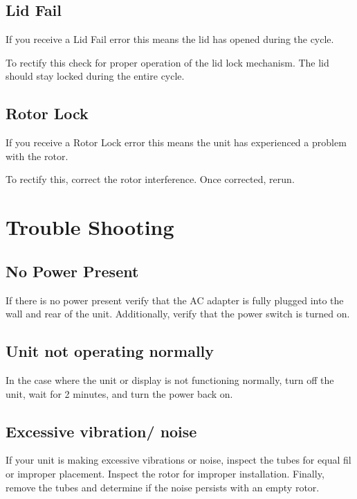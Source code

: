 \documentclass[12pt]{../SOP3_beta}
\begin{document}
\subsection*{Lid Fail}

\NP If you receive a Lid Fail error this means the lid has opened during the cycle. 

\NP To rectify this check for proper operation of the lid lock mechanism. The lid should stay locked during the entire cycle. 

\subsection*{Rotor Lock}

\NP If you receive a Rotor Lock error this means the unit has experienced a problem with the rotor. 

\NP To rectify this, correct the rotor interference. Once corrected, rerun. 

\section{Trouble Shooting}

\subsection*{No Power Present} 

\NP If there is no power present verify that the AC adapter is fully plugged into the wall and rear of the unit. Additionally, verify that the power switch is turned on. 

\subsection*{Unit not operating normally}

\NP In the case where the unit or display is not functioning normally, turn off the unit, wait for 2 minutes, and turn the power back on. 

\subsection*{Excessive vibration/ noise}

\NP If your unit is making excessive vibrations or noise, inspect the tubes for equal fil or improper placement. Inspect the rotor for improper installation. Finally, remove the tubes and determine if the noise persists with an empty rotor. 
\end{document}
